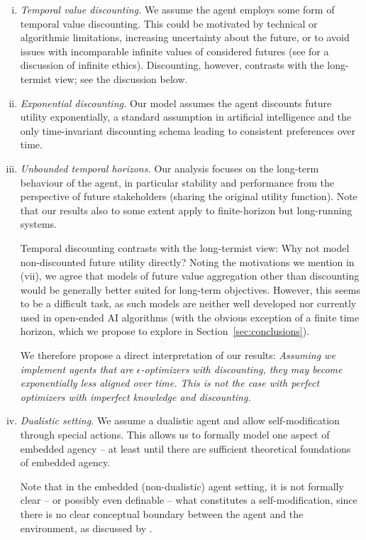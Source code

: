 \begin{enumerate}[(i)]
    \item \emph{Temporal value discounting.} We assume the agent employs some form of temporal value discounting. This could be motivated by technical or algorithmic limitations, increasing uncertainty about the future, or to avoid issues with incomparable infinite values of considered futures (see \citet{Bostrom2011} for a discussion of infinite ethics). Discounting, however, contrasts with the long-termist view; see the discussion below.
    \item \emph{Exponential discounting.} Our model assumes the agent discounts future utility exponentially, a standard assumption in artificial intelligence and the only time-invariant discounting schema \cite{strotz1955myopia} leading to consistent preferences over time.
    \item \emph{Unbounded temporal horizons.} Our analysis focuses on the long-term behaviour of the agent, in particular stability and performance from the perspective of future stakeholders (sharing the original utility function). Note that our results also to some extent apply to finite-horizon but long-running systems.

    Temporal discounting contrasts with the long-termist view: Why not model non-discounted future utility directly? Noting the motivations we mention in (vii), we agree that models of future value aggregation other than discounting would be generally better suited for long-term objectives. However, this seems to be a difficult task, as such models are neither well developed nor currently used in open-ended AI algorithms (with the obvious exception of a finite time horizon, which we propose to explore in Section~\ref{sec:conclusions}).
    
    We therefore propose a direct interpretation of our results: \emph{Assuming we implement agents that are $\epsilon$-optimizers with discounting, they may become exponentially less aligned over time. This is not the case with perfect optimizers with imperfect knowledge and discounting.}
    \item \emph{Dualistic setting.} We assume a dualistic agent and allow self-modification through special actions. This allows us to formally model one aspect of embedded agency -- at least until there are sufficient theoretical foundations of embedded agency.

    Note that in the embedded (non-dualistic) agent setting, it is not formally clear -- or possibly even definable -- what constitutes a self-modification, since there is no clear conceptual boundary between the agent and the environment, as discussed by \citet{EmbeddedAgency}.
\end{enumerate}

